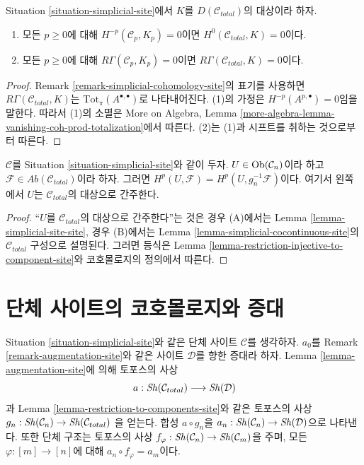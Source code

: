 \begin{lemma}
\label{lemma-simplicial-sheaf-cohomology-site-zero}
Situation \ref{situation-simplicial-site}에서 $K$를
$D(\mathcal{C}_{total})$의 대상이라 하자.
\begin{enumerate}
\item 모든 $p \geq 0$에 대해
$H^{-p}(\mathcal{C}_p, K_p) = 0$이면
$H^0(\mathcal{C}_{total}, K) = 0$이다.
\item 모든 $p \geq 0$에 대해 $R\Gamma(\mathcal{C}_p, K_p) = 0$이면
$R\Gamma(\mathcal{C}_{total}, K) = 0$이다.
\end{enumerate}
\end{lemma}

\begin{proof}
Remark \ref{remark-simplicial-cohomology-site}의 표기를 사용하면
$R\Gamma(\mathcal{C}_{total}, K)$는
$\text{Tot}_\pi(A^{\bullet, \bullet})$로 나타내어진다.
(1)의 가정은 $H^{-p}(A^{p, \bullet}) = 0$임을 말한다.
따라서 (1)의 소멸은 More on Algebra, Lemma
\ref{more-algebra-lemma-vanishing-coh-prod-totalization}에서 따른다.
(2)는 (1)과 시프트를 취하는 것으로부터 따른다.
\end{proof}

\begin{lemma}
\label{lemma-sanity-check}
$\mathcal{C}$를 Situation \ref{situation-simplicial-site}와 같이 두자.
$U \in \mathop{\mathrm{Ob}}\nolimits(\mathcal{C}_n)$이라 하고
$\mathcal{F} \in \textit{Ab}(\mathcal{C}_{total})$이라 하자.
그러면 $H^p(U, \mathcal{F}) = H^p(U, g_n^{-1}\mathcal{F})$이다.
여기서 왼쪽에서 $U$는 $\mathcal{C}_{total}$의 대상으로 간주한다.
\end{lemma}

\begin{proof}
“$U$를 $\mathcal{C}_{total}$의 대상으로 간주한다”는 것은
경우 (A)에서는 Lemma \ref{lemma-simplicial-site-site}, 경우 (B)에서는
Lemma \ref{lemma-simplicial-cocontinuous-site}의
$\mathcal{C}_{total}$ 구성으로 설명된다. 그러면 등식은
Lemma \ref{lemma-restriction-injective-to-component-site}와
코호몰로지의 정의에서 따른다.
\end{proof}

\section{단체 사이트의 코호몰로지와 증대}
\label{section-cohomology-augmentation-simplicial-sites}

\noindent
Situation \ref{situation-simplicial-site}와 같은 단체 사이트
$\mathcal{C}$를 생각하자. $a_0$를 Remark \ref{remark-augmentation-site}와
같은 사이트 $\mathcal{D}$를 향한 증대라 하자.
Lemma \ref{lemma-augmentation-site}에 의해 토포스의 사상
$$
a : \mathop{\mathit{Sh}}\nolimits(\mathcal{C}_{total}) \longrightarrow \mathop{\mathit{Sh}}\nolimits(\mathcal{D})
$$
과 Lemma \ref{lemma-restriction-to-components-site}와 같은 토포스의 사상
$g_n : \mathop{\mathit{Sh}}\nolimits(\mathcal{C}_n) \to \mathop{\mathit{Sh}}\nolimits(\mathcal{C}_{total})$
을 얻는다. 합성 $a \circ g_n$을
$a_n : \mathop{\mathit{Sh}}\nolimits(\mathcal{C}_n) \to \mathop{\mathit{Sh}}\nolimits(\mathcal{D})$으로 나타낸다.
또한 단체 구조는 토포스의 사상
$f_\varphi : \mathop{\mathit{Sh}}\nolimits(\mathcal{C}_n) \to \mathop{\mathit{Sh}}\nolimits(\mathcal{C}_m)$을 주며,
모든 $\varphi : [m] \to [n]$에 대해
$a_n \circ f_\varphi = a_m$이다.

